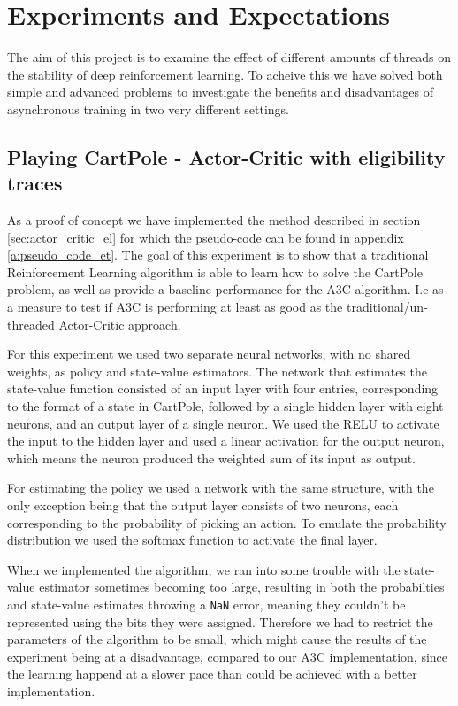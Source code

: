 \documentclass[11pt]{article}
\begin{document}

\section{Experiments and Expectations}

The aim of this project is to examine the effect of different amounts of threads
on the stability of deep reinforcement learning.
To acheive this we have solved both simple and advanced problems to investigate
the benefits and disadvantages of asynchronous training in two very different
settings.

\subsection{Playing CartPole - Actor-Critic with eligibility traces}

As a proof of concept we have implemented the method described in section
\ref{sec:actor_critic_el} for which the pseudo-code
can be found in appendix \ref{a:pseudo_code_et}.
The goal of this experiment is to show that a 
traditional Reinforcement Learning algorithm
is able to learn how to solve the CartPole problem, as well as provide a
baseline performance for the A3C algorithm.
I.e as a measure to test if A3C is performing at least as good
as the traditional/un-threaded Actor-Critic approach.

For this experiment we used two separate neural networks, with no
shared weights, as policy and state-value estimators.
The network that estimates the state-value function consisted of an
input layer with four entries, corresponding to the format of a state in CartPole,
followed by a single hidden layer with eight neurons, and an output layer of a single
neuron.
We used the RELU to activate the input to the
hidden layer and used a linear activation for the output neuron,
which means the neuron produced the weighted sum of its input as output.

For estimating the policy we used a network with the same structure,
with the only exception being that the output layer consists of two
neurons, each corresponding to the probability of picking an action.
To emulate the probability distribution we used the softmax function
to activate the final layer.

When we implemented the algorithm, we ran into some trouble with
the state-value estimator sometimes becoming too large, resulting
in both the probabilties and state-value estimates throwing a \texttt{NaN} error,
meaning they couldn't be represented using the bits they were assigned.
Therefore we had to restrict the parameters of the algorithm to
be small, which might cause the results of the
experiment being at a disadvantage, compared to our A3C implementation, since the learning happend
at a slower pace than could be achieved with a better implementation.
\end{document}
